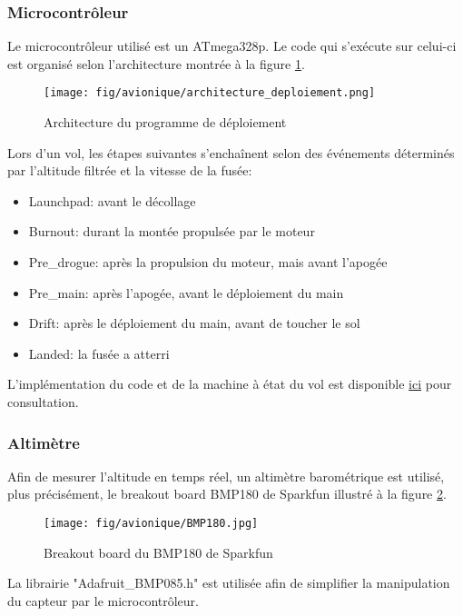 \subsubsection{Microcontrôleur}

Le microcontrôleur utilisé est un ATmega328p. Le code qui s'exécute sur celui-ci
est organisé selon l'architecture montrée à la figure \ref{f:arch_deploiement}.

\begin{figure}[H]
	\center
	\texttt{[image: fig/avionique/architecture\_deploiement.png]}
	\caption{Architecture du programme de déploiement}
	\label{f:arch_deploiement}
\end{figure}

Lors d'un vol, les étapes suivantes s'enchaînent selon des événements déterminés
par l'altitude filtrée et la vitesse de la fusée:

\begin{itemize}
	\item Launchpad: avant le décollage
	\item Burnout: durant la montée propulsée par le moteur
	\item Pre\_drogue: après la propulsion du moteur, mais avant l'apogée
	\item Pre\_main: après l'apogée, avant le déploiement du main
	\item Drift: après le déploiement du main, avant de toucher le sol
	\item Landed: la fusée a atterri
\end{itemize}


L'implémentation du code et de la machine à état du vol est disponible
\href{https://github.com/ul-gaul/deploiement}{ici} pour consultation.

\subsubsection{Altimètre}

Afin de mesurer l'altitude en temps réel, un altimètre barométrique est
utilisé, plus précisément, le breakout board BMP180 de Sparkfun illustré à la
figure \ref{f:BMP180}.

\begin{figure}[H]
	\center
	\texttt{[image: fig/avionique/BMP180.jpg]}
	\caption{Breakout board du BMP180 de Sparkfun}
	\label{f:BMP180}
\end{figure}

La librairie "Adafruit\_BMP085.h" est utilisée afin de simplifier la
manipulation du capteur par le microcontrôleur.


